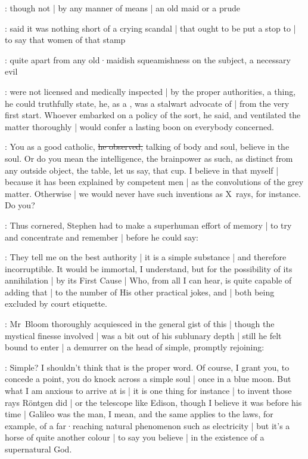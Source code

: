 :
though not |
by any manner of means |
an old maid or a prude

:
said it was nothing short of a crying scandal |
that ought to be put a stop to  |
to say that women of that stamp

:
quite apart from any old·maidish squeamishness on the subject,
a necessary evil

:
were not licensed and medically inspected |
by the proper authorities,
a thing,
he could truthfully state,
he,
as a ,
was a stalwart advocate of |
from the very first start.
Whoever embarked on a policy of the sort,
he said,
and ventilated the matter thoroughly |
would confer a lasting boon on everybody concerned.

\Bloom:
You as a good catholic,
\sout{he observed,}
talking of body and soul,
believe in the soul.
Or do you mean the intelligence,
the brainpower as such,
as distinct from any outside object,
the table,
let us say,
that cup.
I believe in that myself |
because it has been explained by competent men |
as the convolutions of the grey matter.
Otherwise |
we would never have such inventions as X~rays,
for instance.
Do you?

:
Thus cornered,
Stephen had to make a superhuman effort of memory |
to try and concentrate and remember |
before he could say:

\Stephen:
They tell me on the best authority |
it is a simple substance |
and therefore incorruptible.
It would be immortal,
I understand,
but for the possibility of its annihilation |
by its First Cause |
Who,
from all I can hear,
is quite capable of adding that |
to the number of His other practical jokes,
 and  |
both being excluded
by court etiquette.

:
Mr~Bloom thoroughly acquiesced in the general gist of this |
though the mystical finesse involved |
was a bit out of his sublunary depth |
still he felt bound to enter |
a demurrer on the head of simple,
promptly rejoining:

\Bloom:
Simple?
I shouldn't think that is the proper word.
Of course,
I grant you,
to concede a point,
you do knock across a simple soul |
once in a blue moon.
But what I am anxious to arrive at is |
it is one thing for instance |
to invent those rays Röntgen did |
or the telescope like Edison,
though I believe it was before his time |
Galileo was the man,
I mean,
and the same applies to the laws,
for example,
of a far·reaching natural phenomenon such as electricity |
but it's a horse of quite another colour |
to say you believe |
in the existence of a supernatural God.

